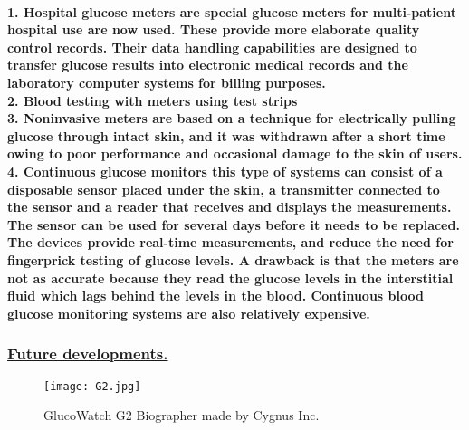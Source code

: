 \documentclass[12pt]{article}
\begin{document}
    \paragraph{\textbf{1. Hospital glucose meters} are special glucose meters for multi-patient hospital use are now used. These provide more elaborate quality control records. Their data handling capabilities are designed to transfer glucose results into electronic medical records and the laboratory computer systems for billing purposes.
    \\\textbf{2. Blood testing with meters using test strips}
    \\\textbf{3. Noninvasive meters} are based on a technique for electrically pulling glucose through intact skin, and it was withdrawn after a short time owing to poor performance and occasional damage to the skin of users.
    \\\textbf{4. Continuous glucose monitors} this type of systems can consist of a disposable sensor placed under the skin, a transmitter connected to the sensor and a reader that receives and displays the measurements. The sensor can be used for several days before it needs to be replaced. The devices provide real-time measurements, and reduce the need for fingerprick testing of glucose levels. A drawback is that the meters are not as accurate because they read the glucose levels in the interstitial fluid which lags behind the levels in the blood. Continuous blood glucose monitoring systems are also relatively expensive.}
    \subsubsection{\underline{Future developments.}}
     \begin{figure}[h]
    	\texttt{[image: G2.jpg]}
    	\caption{ GlucoWatch G2 Biographer made by Cygnus Inc.}
    \end{figure}
\end{document}
